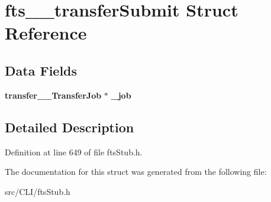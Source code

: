 \section{fts\_\-\_\-transferSubmit Struct Reference}
\label{structfts____transferSubmit}
\subsection*{Data Fields}
\begin{DoxyCompactItemize}
\item 
{\bf transfer\_\-\_\-TransferJob} $\ast$ {\bfseries \_\-job}\label{structfts____transferSubmit_a7d1fb9727ce49b6cc979b090995451f8}

\end{DoxyCompactItemize}


\subsection{Detailed Description}


Definition at line 649 of file ftsStub.h.



The documentation for this struct was generated from the following file:\begin{DoxyCompactItemize}
\item 
src/CLI/ftsStub.h\end{DoxyCompactItemize}

